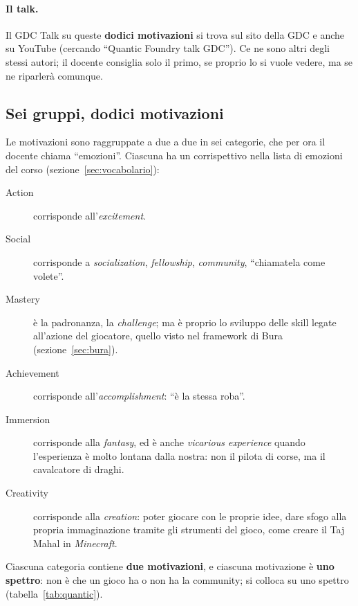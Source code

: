 \paragraph{Il talk.} Il GDC Talk su queste \textbf{dodici motivazioni} si trova
sul sito della GDC e anche su YouTube (cercando ``Quantic Foundry talk
GDC''). Ce ne sono altri degli stessi autori; il docente consiglia solo il
primo, se proprio lo si vuole vedere, ma se ne riparlerà comunque.

\subsection{Sei gruppi, dodici motivazioni}

Le motivazioni sono raggruppate a due a due in sei categorie, che per ora il
docente chiama ``emozioni''. Ciascuna ha un corrispettivo nella lista di
emozioni del corso (sezione~\ref{sec:vocabolario}):
\begin{description}
  \item[Action] corrisponde all'\emph{excitement}.
  \item[Social] corrisponde a \emph{socialization}, \emph{fellowship},
        \emph{community}, ``chiamatela come volete''.
  \item[Mastery] è la padronanza, la \emph{challenge}; ma è proprio lo
        sviluppo delle skill legate all'azione del giocatore, quello visto
        nel framework di Bura (sezione~\ref{sec:bura}).
  \item[Achievement] corrisponde all'\emph{accomplishment}: ``è la stessa
        roba''.
  \item[Immersion] corrisponde alla \emph{fantasy}, ed è anche
        \emph{vicarious experience} quando l'esperienza è molto lontana dalla
        nostra: non il pilota di corse, ma il cavalcatore di draghi.
  \item[Creativity] corrisponde alla \emph{creation}: poter giocare con le
        proprie idee, dare sfogo alla propria immaginazione tramite gli
        strumenti del gioco, come creare il Taj Mahal in \emph{Minecraft}.
\end{description}
Ciascuna categoria contiene \textbf{due motivazioni}, e ciascuna motivazione
è \textbf{uno spettro}: non è che un gioco ha o non ha la community; si
colloca su uno spettro (tabella~\ref{tab:quantic}).

